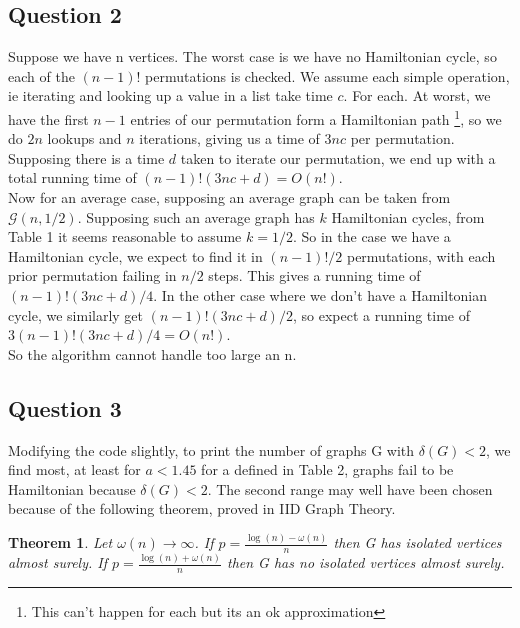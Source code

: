 \documentclass[10pt,a4paper]{report}
\newtheorem*{theorem}{Theorem}
\begin{document}
\subsection*{Question 2}
Suppose we have n vertices. The worst case is we have no Hamiltonian cycle, so each of the $(n-1)!$ permutations is checked. We assume each simple operation, ie iterating and looking up a value in a list take time $c$. For each. At worst, we have the first $n-1$ entries of our permutation form a Hamiltonian path \footnote{This can't happen for each but its an ok approximation}, so we do $2n$ lookups and $n$ iterations, giving us a time of $3nc$ per permutation. Supposing there is a time $d$ taken to iterate our permutation, we end up with a total running time of $(n-1)!(3nc+d) = O(n!)$.\\

Now for an average case, supposing an average graph can be taken from $\mathcal{G}(n,1/2)$. Supposing such an average graph has $k$ Hamiltonian cycles, from Table 1 it seems reasonable to assume $k=1/2$. So in the case we have a Hamiltonian cycle, we expect to find it in $(n-1)!/2$ permutations, with each prior permutation failing in $n/2$ steps. This gives a running time of $(n-1)!(3nc+d)/4$. In the other case where we don't have a Hamiltonian cycle, we similarly get $(n-1)!(3nc+d)/2$, so expect a running time of $3(n-1)!(3nc+d)/4 = O(n!)$. \\

So the algorithm cannot handle too large an n.

\subsection*{Question 3}
Modifying the code slightly, to print the number of graphs G with $\delta(G) < 2$, we find most, at least for $a<1.45$ for a defined in Table 2, graphs fail to be Hamiltonian because  $\delta(G) < 2$. The second range may well have been chosen because of the following theorem, proved in IID Graph Theory.

\begin{theorem}
Let $\omega(n) \rightarrow \infty$.  If $p =\frac{\log(n)-\omega(n)}{n}$ then G has isolated vertices almost surely.  If $p =\frac{\log(n)+\omega(n)}{n}$ then G has no isolated vertices almost surely.
\end{theorem}
\end{document}
